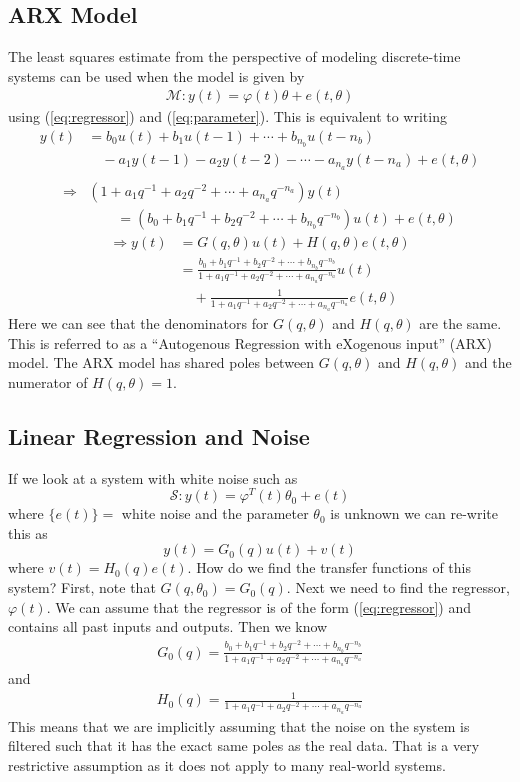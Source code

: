 \subsection{ARX Model}
The least squares estimate from the perspective of modeling discrete-time systems can be used when the model is given by
\begin{align}
\mathcal{M}: y(t) = \varphi(t)\theta + e(t,\theta)
\end{align}
using (\ref{eq:regressor}) and (\ref{eq:parameter}).
This is equivalent to writing
\begin{align*}
y(t) &= b_0u(t) + b_1u(t-1) + \cdots + b_{n_b}u(t-n_b) \\
&\quad- a_1y(t-1) - a_2y(t-2) - \cdots - a_{n_a}y(t-n_a) + e(t,\theta) \\
\end{align*}
\begin{align*}
\Rightarrow &(1+a_1q^{-1}+a_2q^{-2}+\cdots+a_{n_a}q^{-n_a})y(t) \\
&\qquad = (b_0+b_1q^{-1}+b_2q^{-2}+\cdots+b_{n_b}q^{-n_b})u(t) + e(t,\theta)
\end{align*}
\begin{align*}
\Rightarrow y(t) &= G(q,\theta)u(t) + H(q,\theta)e(t,\theta) \\
&= \frac{b_0+b_1q^{-1}+b_2q^{-2}+\cdots+b_{n_b}q^{-n_b}}{1+a_1q^{-1}+a_2q^{-2}+\cdots+a_{n_a}q^{-n_a}}u(t) \\
&\quad + \frac{1}{1+a_1q^{-1}+a_2q^{-2}+\cdots+a_{n_a}q^{-n_a}}e(t,\theta)
\end{align*}
Here we can see that the denominators for $G(q,\theta)$ and $H(q,\theta)$ are the same.
This is referred to as a ``Autogenous Regression with eXogenous input'' (ARX) model.
The ARX model has shared poles between $G(q,\theta)$ and $H(q,\theta)$ and the numerator of $H(q,\theta)=1$.

\subsection{Linear Regression and Noise}
If we look at a system with white noise such as
$$\mathcal{S}: y(t) = \varphi^T(t)\theta_0 + e(t)$$
where $\{e(t)\}=$ white noise and the parameter $\theta_0$ is unknown we can re-write this as
$$y(t) = G_0(q)u(t) + v(t)$$
where $v(t)=H_0(q)e(t)$.
How do we find the transfer functions of this system? First, note that $G(q,\theta_0)=G_0(q)$.
Next we need to find the regressor, $\varphi(t)$.
We can assume that the regressor is of the form (\ref{eq:regressor}) and contains all past inputs and outputs.
Then we know
\begin{align}
\label{eq:g}
G_0(q) = \frac{b_0+b_1q^{-1}+b_2q^{-2}+\cdots+b_{n_b}q^{-n_b}}{1+a_1q^{-1}+a_2q^{-2}+\cdots+a_{n_a}q^{-n_a}}
\end{align}
and
\begin{align}
\label{eq:h}
H_0(q) = \frac{1}{1+a_1q^{-1}+a_2q^{-2}+\cdots+a_{n_a}q^{-n_a}}
\end{align}
This means that we are implicitly assuming that the noise on the system is filtered such that it has the exact same poles as the real data.
That is a very restrictive assumption as it does not apply to many real-world systems.

